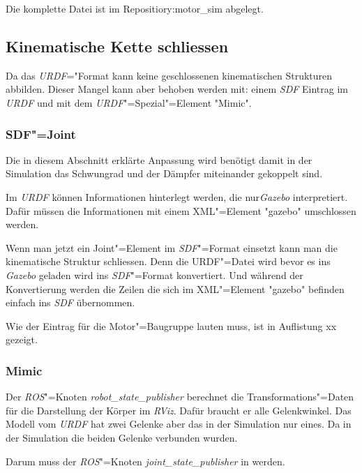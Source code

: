 Die komplette Datei ist im Repositiory:motor\_sim abgelegt.


\subsection{Kinematische Kette schliessen}
Da das \textit{URDF}="Format kann keine geschlossenen kinematischen Strukturen abbilden.
Dieser Mangel kann aber behoben werden mit: einem \textit{SDF} Eintrag im \textit{URDF} und mit dem \textit{URDF}"=Spezial"=Element \textsc{"}Mimic\textsc{"}.

\subsubsection{SDF"=Joint}
Die in diesem Abschnitt erklärte Anpassung wird benötigt damit in der Simulation das Schwungrad und der Dämpfer miteinander gekoppelt sind.

Im \textit{URDF} können Informationen hinterlegt werden, die nur\textit{Gazebo} interpretiert.
Dafür müssen die Informationen mit einem XML"=Element \textsc{"}gazebo\textsc{"} umschlossen werden.

Wenn man jetzt ein Joint"=Element im \textit{SDF}"=Format einsetzt kann man die kinematische Struktur schliessen.
Denn die {URDF}"=Datei wird bevor es ins \textit{Gazebo} geladen wird ins \textit{SDF}"=Format konvertiert.
Und während der Konvertierung werden die Zeilen die sich im XML"=Element \textsc{"}gazebo\textsc{"} befinden einfach ins \textit{SDF} übernommen.

Wie der Eintrag für die Motor"=Baugruppe lauten muss, ist in Auflistung xx gezeigt.

\subsubsection{Mimic}
Der \textit{ROS}"=Knoten \textit{robot\_state\_publisher} berechnet die Transformations"=Daten für die Darstellung der Körper im \textit{RViz}.
Dafür braucht er alle Gelenkwinkel.
Das Modell vom \textit{URDF} hat zwei Gelenke aber das in der Simulation nur eines.
Da in der Simulation die beiden Gelenke verbunden wurden.


Darum muss der \textit{ROS}"=Knoten \textit{joint\_state\_publisher} in  werden.




